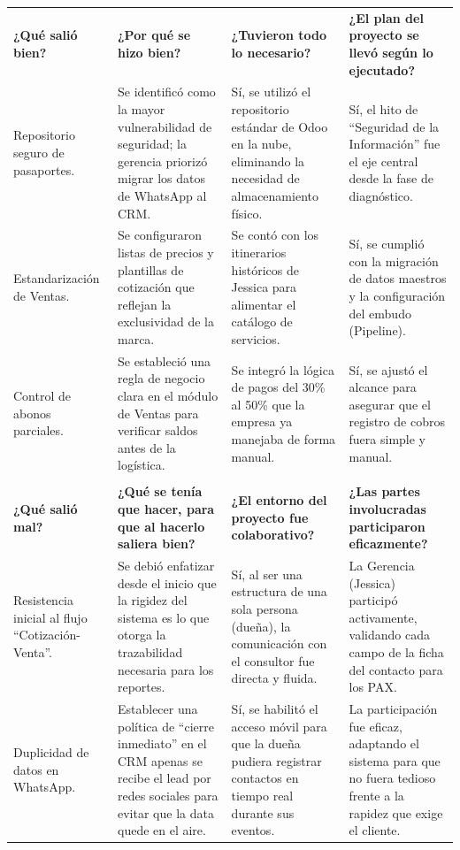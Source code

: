 \documentclass[11pt]{article}
\begin{document}
\begin{longtable}{|p{3.8cm}|p{3.8cm}|p{3.8cm}|p{3.8cm}|}
\hline
\rowcolor{RoundGray}\multicolumn{4}{|l|}{\textbf{Primera Ronda}} \\ \hline
\rowcolor{HeaderGray}\textbf{¿Qué salió bien?} & \textbf{¿Por qué se hizo bien?} & \textbf{¿Tuvieron todo lo necesario?} & \textbf{¿El plan del proyecto se llevó según lo ejecutado?} \\ \hline
Repositorio seguro de pasaportes. &
Se identificó como la mayor vulnerabilidad de seguridad; la gerencia priorizó migrar los datos de WhatsApp al CRM. &
Sí, se utilizó el repositorio estándar de Odoo en la nube, eliminando la necesidad de almacenamiento físico. &
Sí, el hito de ``Seguridad de la Información'' fue el eje central desde la fase de diagnóstico. \\ \hline
Estandarización de Ventas. &
Se configuraron listas de precios y plantillas de cotización que reflejan la exclusividad de la marca. &
Se contó con los itinerarios históricos de Jessica para alimentar el catálogo de servicios. &
Sí, se cumplió con la migración de datos maestros y la configuración del embudo (Pipeline). \\ \hline
Control de abonos parciales. &
Se estableció una regla de negocio clara en el módulo de Ventas para verificar saldos antes de la logística. &
Se integró la lógica de pagos del 30\% al 50\% que la empresa ya manejaba de forma manual. &
Sí, se ajustó el alcance para asegurar que el registro de cobros fuera simple y manual. \\ \hline

\rowcolor{RoundGray}\multicolumn{4}{|l|}{\textbf{Segunda Ronda}} \\ \hline
\rowcolor{HeaderGray}\textbf{¿Qué salió mal?} & \textbf{¿Qué se tenía que hacer, para que al hacerlo saliera bien?} & \textbf{¿El entorno del proyecto fue colaborativo?} & \textbf{¿Las partes involucradas participaron eficazmente?} \\ \hline
Resistencia inicial al flujo ``Cotización-Venta''. &
Se debió enfatizar desde el inicio que la rigidez del sistema es lo que otorga la trazabilidad necesaria para los reportes. &
Sí, al ser una estructura de una sola persona (dueña), la comunicación con el consultor fue directa y fluida. &
La Gerencia (Jessica) participó activamente, validando cada campo de la ficha del contacto para los PAX. \\ \hline
Duplicidad de datos en WhatsApp. &
Establecer una política de ``cierre inmediato'' en el CRM apenas se recibe el lead por redes sociales para evitar que la data quede en el aire. &
Sí, se habilitó el acceso móvil para que la dueña pudiera registrar contactos en tiempo real durante sus eventos. &
La participación fue eficaz, adaptando el sistema para que no fuera tedioso frente a la rapidez que exige el cliente. \\ \hline


\end{longtable}
\end{document}
